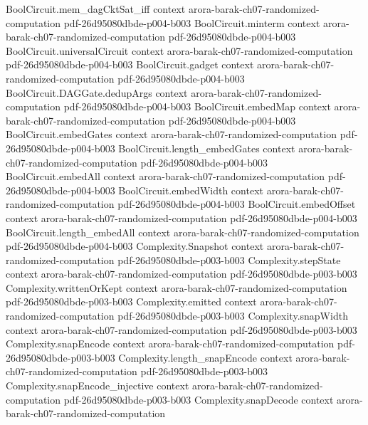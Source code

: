 \begin{theorem}
\proofstep
  {BoolCircuit.mem_dagCktSat_iff}
  {context}
  {arora-barak-ch07-randomized-computation}
  {pdf-26d95080dbde-p004-b003}
\proofstep
  {BoolCircuit.minterm}
  {context}
  {arora-barak-ch07-randomized-computation}
  {pdf-26d95080dbde-p004-b003}
\proofstep
  {BoolCircuit.universalCircuit}
  {context}
  {arora-barak-ch07-randomized-computation}
  {pdf-26d95080dbde-p004-b003}
\proofstep
  {BoolCircuit.gadget}
  {context}
  {arora-barak-ch07-randomized-computation}
  {pdf-26d95080dbde-p004-b003}
\proofstep
  {BoolCircuit.DAGGate.dedupArgs}
  {context}
  {arora-barak-ch07-randomized-computation}
  {pdf-26d95080dbde-p004-b003}
\proofstep
  {BoolCircuit.embedMap}
  {context}
  {arora-barak-ch07-randomized-computation}
  {pdf-26d95080dbde-p004-b003}
\proofstep
  {BoolCircuit.embedGates}
  {context}
  {arora-barak-ch07-randomized-computation}
  {pdf-26d95080dbde-p004-b003}
\proofstep
  {BoolCircuit.length_embedGates}
  {context}
  {arora-barak-ch07-randomized-computation}
  {pdf-26d95080dbde-p004-b003}
\proofstep
  {BoolCircuit.embedAll}
  {context}
  {arora-barak-ch07-randomized-computation}
  {pdf-26d95080dbde-p004-b003}
\proofstep
  {BoolCircuit.embedWidth}
  {context}
  {arora-barak-ch07-randomized-computation}
  {pdf-26d95080dbde-p004-b003}
\proofstep
  {BoolCircuit.embedOffset}
  {context}
  {arora-barak-ch07-randomized-computation}
  {pdf-26d95080dbde-p004-b003}
\proofstep
  {BoolCircuit.length_embedAll}
  {context}
  {arora-barak-ch07-randomized-computation}
  {pdf-26d95080dbde-p004-b003}
\proofstep
  {Complexity.Snapshot}
  {context}
  {arora-barak-ch07-randomized-computation}
  {pdf-26d95080dbde-p003-b003}
\proofstep
  {Complexity.stepState}
  {context}
  {arora-barak-ch07-randomized-computation}
  {pdf-26d95080dbde-p003-b003}
\proofstep
  {Complexity.writtenOrKept}
  {context}
  {arora-barak-ch07-randomized-computation}
  {pdf-26d95080dbde-p003-b003}
\proofstep
  {Complexity.emitted}
  {context}
  {arora-barak-ch07-randomized-computation}
  {pdf-26d95080dbde-p003-b003}
\proofstep
  {Complexity.snapWidth}
  {context}
  {arora-barak-ch07-randomized-computation}
  {pdf-26d95080dbde-p003-b003}
\proofstep
  {Complexity.snapEncode}
  {context}
  {arora-barak-ch07-randomized-computation}
  {pdf-26d95080dbde-p003-b003}
\proofstep
  {Complexity.length_snapEncode}
  {context}
  {arora-barak-ch07-randomized-computation}
  {pdf-26d95080dbde-p003-b003}
\proofstep
  {Complexity.snapEncode_injective}
  {context}
  {arora-barak-ch07-randomized-computation}
  {pdf-26d95080dbde-p003-b003}
\proofstep
  {Complexity.snapDecode}
  {context}
  {arora-barak-ch07-randomized-computation}

\end{theorem}
